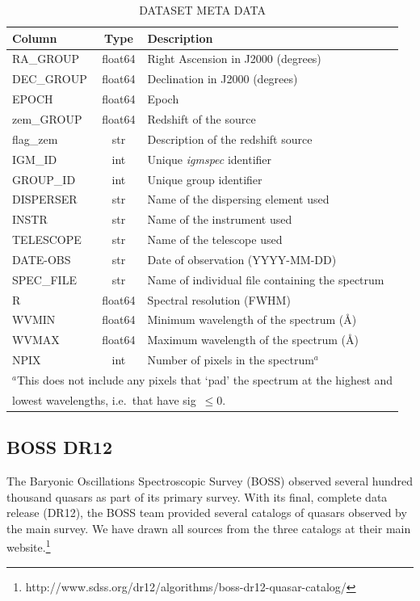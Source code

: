 \documentclass[12pt]{elsarticle}
\begin{document}
\begin{table}[ht]
\caption{DATASET META DATA\label{tab:meta_spec}}
\footnotesize
\begin{tabular}{lcl}
Column & Type  & Description \\
\hline
RA\_GROUP    & float64 & Right Ascension in J2000 (degrees) \\
DEC\_GROUP   & float64 & Declination in J2000 (degrees) \\
EPOCH        & float64 & Epoch \\
zem\_GROUP   & float64 & Redshift of the source \\
flag\_zem    & str     & Description of the redshift source \\
IGM\_ID      & int     & Unique {\it igmspec} identifier \\
GROUP\_ID    & int     & Unique group identifier \\
DISPERSER    & str     & Name of the dispersing element used \\
INSTR        & str     & Name of the instrument used \\
TELESCOPE    & str     & Name of the telescope used \\
DATE-OBS     & str     & Date of observation (YYYY-MM-DD) \\
SPEC\_FILE   & str     & Name of individual file containing the spectrum \\
R            & float64 & Spectral resolution (FWHM) \\
WVMIN        & float64 & Minimum wavelength of the spectrum (\AA) \\
WVMAX        & float64 & Maximum wavelength of the spectrum (\AA) \\
NPIX         & int     & Number of pixels in the spectrum$^a$ \\
\hline
\multicolumn{3}{l}{
{$^a$}{This does not include any pixels that `pad' the
spectrum at the highest and 
}} \\
\multicolumn{3}{l}{lowest wavelengths,  i.e.\ that have sig~$\le 0$.}
\end{tabular}
\end{table}



\subsection{BOSS DR12}

The Baryonic Oscillations Spectroscopic Survey (BOSS)
observed several hundred thousand quasars as part of its
primary survey.  With its final, complete data release
(DR12), the BOSS team provided several catalogs of quasars
observed by the main survey.  We have drawn all sources
from the three catalogs at their main website.\footnote{http://www.sdss.org/dr12/algorithms/boss-dr12-quasar-catalog/}
\end{document}
